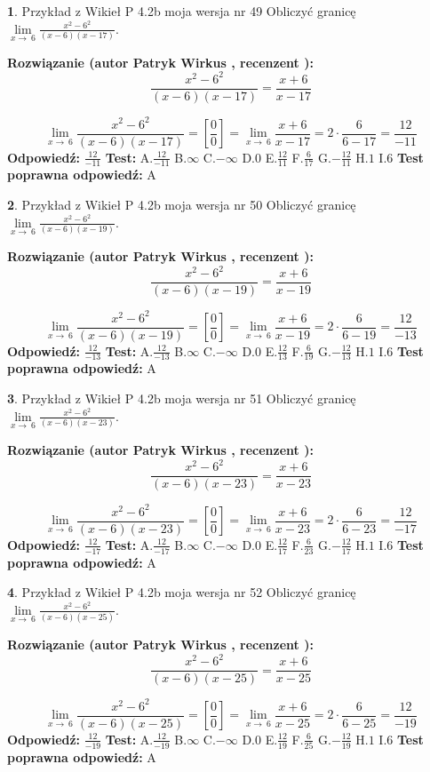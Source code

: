 \documentclass[12pt, a4paper]{article}
\theoremstyle{definition} %
\newtheorem{zad}{}
\newcommand{\zadStart}[1]{\begin{zad}#1\newline}
\newcommand{\zadStop}{\end{zad}}
\newcommand{\rozwStart}[2]{\noindent \textbf{Rozwiązanie (autor #1 , recenzent #2): }\newline}
\newcommand{\rozwStop}{\newline}
\newcommand{\odpStart}{\noindent \textbf{Odpowiedź:}\newline}
\newcommand{\odpStop}{\newline}
\newcommand{\testStart}{\noindent \textbf{Test:}\newline}
\newcommand{\testStop}{\newline}
\newcommand{\kluczStart}{\noindent \textbf{Test poprawna odpowiedź:}\newline}
\newcommand{\kluczStop}{\newline}
\begin{document}
\zadStart{Przykład z Wikieł P 4.2b moja wersja nr 49}
Obliczyć granicę $\lim\limits_{x\to\ 6}\frac{x^{2}-6^{2}}{(x-6)(x-17)}$.
\zadStop
\rozwStart{Patryk Wirkus}{}
$$\frac{x^{2}-6^{2}}{(x-6)(x-17)}=\frac{x+6}{x-17}$$

$$\lim\limits_{x\to\ 6}\frac{x^{2}-6^{2}}{(x-6)(x-17)}=[\frac{0}{0}]=\lim\limits_{x\to\ 6}\frac{x+6}{x-17}=2 \cdot \frac{6}{6-17} = \frac{12}{-11}$$
\rozwStop
\odpStart
$\frac{12}{-11}$
\odpStop
\testStart
A.$\frac{12}{-11}$
B.$\infty$
C.$-\infty$
D.$0$
E.$\frac{12}{11}$
F.$\frac{6}{17}$
G.$-\frac{12}{11}$
H.$1$
I.$6$
\testStop
\kluczStart
A
\kluczStop



\zadStart{Przykład z Wikieł P 4.2b moja wersja nr 50}
Obliczyć granicę $\lim\limits_{x\to\ 6}\frac{x^{2}-6^{2}}{(x-6)(x-19)}$.
\zadStop
\rozwStart{Patryk Wirkus}{}
$$\frac{x^{2}-6^{2}}{(x-6)(x-19)}=\frac{x+6}{x-19}$$

$$\lim\limits_{x\to\ 6}\frac{x^{2}-6^{2}}{(x-6)(x-19)}=[\frac{0}{0}]=\lim\limits_{x\to\ 6}\frac{x+6}{x-19}=2 \cdot \frac{6}{6-19} = \frac{12}{-13}$$
\rozwStop
\odpStart
$\frac{12}{-13}$
\odpStop
\testStart
A.$\frac{12}{-13}$
B.$\infty$
C.$-\infty$
D.$0$
E.$\frac{12}{13}$
F.$\frac{6}{19}$
G.$-\frac{12}{13}$
H.$1$
I.$6$
\testStop
\kluczStart
A
\kluczStop



\zadStart{Przykład z Wikieł P 4.2b moja wersja nr 51}
Obliczyć granicę $\lim\limits_{x\to\ 6}\frac{x^{2}-6^{2}}{(x-6)(x-23)}$.
\zadStop
\rozwStart{Patryk Wirkus}{}
$$\frac{x^{2}-6^{2}}{(x-6)(x-23)}=\frac{x+6}{x-23}$$

$$\lim\limits_{x\to\ 6}\frac{x^{2}-6^{2}}{(x-6)(x-23)}=[\frac{0}{0}]=\lim\limits_{x\to\ 6}\frac{x+6}{x-23}=2 \cdot \frac{6}{6-23} = \frac{12}{-17}$$
\rozwStop
\odpStart
$\frac{12}{-17}$
\odpStop
\testStart
A.$\frac{12}{-17}$
B.$\infty$
C.$-\infty$
D.$0$
E.$\frac{12}{17}$
F.$\frac{6}{23}$
G.$-\frac{12}{17}$
H.$1$
I.$6$
\testStop
\kluczStart
A
\kluczStop



\zadStart{Przykład z Wikieł P 4.2b moja wersja nr 52}
Obliczyć granicę $\lim\limits_{x\to\ 6}\frac{x^{2}-6^{2}}{(x-6)(x-25)}$.
\zadStop
\rozwStart{Patryk Wirkus}{}
$$\frac{x^{2}-6^{2}}{(x-6)(x-25)}=\frac{x+6}{x-25}$$

$$\lim\limits_{x\to\ 6}\frac{x^{2}-6^{2}}{(x-6)(x-25)}=[\frac{0}{0}]=\lim\limits_{x\to\ 6}\frac{x+6}{x-25}=2 \cdot \frac{6}{6-25} = \frac{12}{-19}$$
\rozwStop
\odpStart
$\frac{12}{-19}$
\odpStop
\testStart
A.$\frac{12}{-19}$
B.$\infty$
C.$-\infty$
D.$0$
E.$\frac{12}{19}$
F.$\frac{6}{25}$
G.$-\frac{12}{19}$
H.$1$
I.$6$
\testStop
\kluczStart
A
\kluczStop
\end{document}
